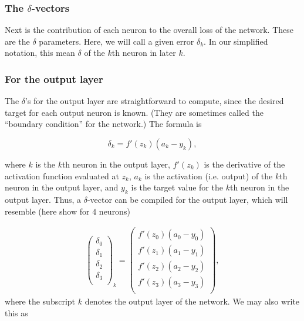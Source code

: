\documentclass[12pt]{article}
\begin{document}
\subsubsection{The $\delta$-vectors}
Next is the contribution of each neuron to the overall loss of the network. These are the $\delta$ parameters. Here, we will call a given error $\delta_k$. In our simplified notation, this mean $\delta$ of the $k$th neuron in later $k$.

\vspace{0.1in}
\subsubsection*{For the output layer}

The $\delta$'s for the output layer are straightforward to compute, since the desired target for each output neuron is known. (They are sometimes called the ``boundary condition'' for the network.) The formula is 

\begin{equation}
\delta_k=f'(z_k)(a_k-y_k),
\end{equation}

where $k$ is the $k$th neuron in the output layer, $f'(z_k)$ is the derivative of the activation function evaluated at $z_k$, $a_k$ is the activation (i.e. output) of the $k$th neuron in the output layer, and $y_k$ is the target value for the $k$th neuron in the output layer.  Thus, a $\delta$-vector can be compiled for the output layer, which will resemble (here show for $4$ neurons)

 \begin{align}
    \begin{pmatrix}
        \delta_0 \\
        \delta_1 \\
        \delta_2 \\
        \delta_3 \\
         \end{pmatrix}_k
 =
    \begin{pmatrix}
        f'(z_0)(a_0-y_0) \\
        f'(z_1)(a_1-y_1) \\
        f'(z_2)(a_2-y_2) \\
        f'(z_3)(a_3-y_3) \\
         \end{pmatrix},
 \end{align}
 where the subscript $k$ denotes the output layer of the network. We may also write this as
 
\end{document}
